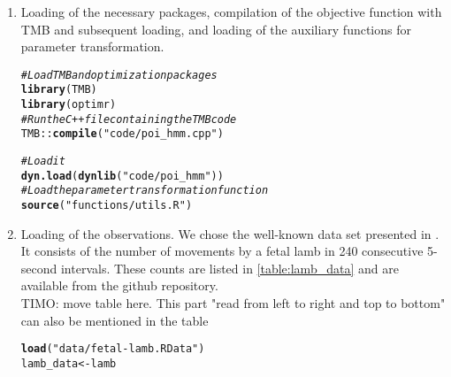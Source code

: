 \documentclass[bimj,fleqn]{w-art}\usepackage[]{graphicx}\usepackage[]{color}
\makeatletter
\newcommand{\hlstr}[1]{\textcolor[rgb]{0.192,0.494,0.8}{#1}}%
\newcommand{\hlcom}[1]{\textcolor[rgb]{0.678,0.584,0.686}{\textit{#1}}}%
\newcommand{\hlopt}[1]{\textcolor[rgb]{0,0,0}{#1}}%
\newcommand{\hlstd}[1]{\textcolor[rgb]{0.345,0.345,0.345}{#1}}%
\newcommand{\hlkwb}[1]{\textcolor[rgb]{0.69,0.353,0.396}{#1}}%
\newcommand{\hlkwd}[1]{\textcolor[rgb]{0.737,0.353,0.396}{\textbf{#1}}}%
\newenvironment{kframe}{%
 \def\at@end@of@kframe{}%
 \ifinner\ifhmode%
  \def\at@end@of@kframe{\end{minipage}}%
  \begin{minipage}{\columnwidth}%
 \fi\fi%
 \def\FrameCommand##1{\hskip\@totalleftmargin \hskip-\fboxsep
 \colorbox{shadecolor}{##1}\hskip-\fboxsep
     \hskip-\linewidth \hskip-\@totalleftmargin \hskip\columnwidth}%
 \MakeFramed {\advance\hsize-\width
   \@totalleftmargin\z@ \linewidth\hsize
   \@setminipage}}%
 {\par\unskip\endMakeFramed%
 \at@end@of@kframe}
\newenvironment{knitrout}{}{} %
\theoremstyle{plain}
\theoremstyle{definition}
\makeatother
\begin{document}
\begin{enumerate}
\item Loading of the necessary packages, compilation of the objective function with TMB and subsequent loading, and loading of the auxiliary functions for parameter transformation.
\begin{knitrout}
\color{fgcolor}\begin{kframe}
\begin{alltt}
\hlcom{# Load TMB and optimization packages}
\hlkwd{library}\hlstd{(TMB)}
\hlkwd{library}\hlstd{(optimr)}
\hlcom{# Run the C++ file containing the TMB code}
\hlstd{TMB}\hlopt{::}\hlkwd{compile}\hlstd{(}\hlstr{"code/poi_hmm.cpp"}\hlstd{)}
\end{alltt}


{\ttfamily\noindent\bfseries{}}\begin{alltt}
\hlcom{# Load it}
\hlkwd{dyn.load}\hlstd{(}\hlkwd{dynlib}\hlstd{(}\hlstr{"code/poi_hmm"}\hlstd{))}
\hlcom{# Load the parameter transformation function}
\hlkwd{source}\hlstd{(}\hlstr{"functions/utils.R"}\hlstd{)}
\end{alltt}
\end{kframe}
\end{knitrout}

\item Loading of the observations. We chose the well-known data set presented in \citet{leroux}. It consists of the number of movements by a fetal lamb in 240 consecutive 5-second intervals. These counts are listed in \autoref{table:lamb_data} and are available from the github repository.\\
TIMO: move table here. This part "read from left to right and top to bottom" can also be mentioned in the table
\begin{knitrout}
\color{fgcolor}\begin{kframe}
\begin{alltt}
\hlkwd{load}\hlstd{(}\hlstr{"data/fetal-lamb.RData"}\hlstd{)}
\hlstd{lamb_data} \hlkwb{<-} \hlstd{lamb}
\end{alltt}
\end{kframe}
\end{knitrout}


\end{enumerate}
\end{document}
